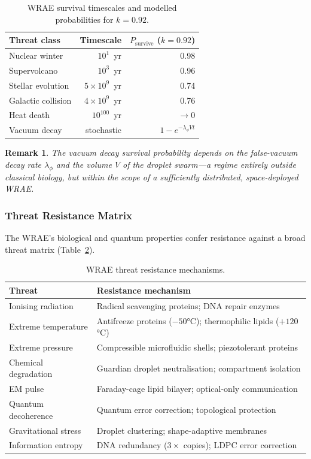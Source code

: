 \documentclass[12pt,a4paper]{article}
\newtheorem{remark}[theorem]{Remark}
\begin{document}
\begin{table}[ht]
\centering
\caption{WRAE survival timescales and modelled probabilities for $k = 0.92$.}
\label{tab:survival}
\begin{tabular}{lrr}
\toprule
\textbf{Threat class} & \textbf{Timescale} & \textbf{$P_\mathrm{survive}$ ($k=0.92$)} \\
\midrule
Nuclear winter          & $10^1$~yr    & 0.98 \\
Supervolcano            & $10^3$~yr    & 0.96 \\
Stellar evolution       & $5\times10^9$~yr  & 0.74 \\
Galactic collision      & $4\times10^9$~yr  & 0.76 \\
Heat death              & $10^{100}$~yr     & $\to 0$ \\
Vacuum decay            & stochastic        & $1-e^{-\lambda_\phi V t}$ \\
\bottomrule
\end{tabular}
\end{table}

\begin{remark}
The vacuum decay survival probability depends on the false-vacuum decay rate
$\lambda_\phi$ and the volume $V$ of the droplet swarm—a regime entirely
outside classical biology, but within the scope of a sufficiently
distributed, space-deployed WRAE.
\end{remark}

\subsubsection{Threat Resistance Matrix}

The WRAE's biological and quantum properties confer resistance against
a broad threat matrix (Table~\ref{tab:threats}).

\begin{table}[ht]
\centering
\caption{WRAE threat resistance mechanisms.}
\label{tab:threats}
\begin{tabular}{lp{6.5cm}}
\toprule
\textbf{Threat} & \textbf{Resistance mechanism} \\
\midrule
Ionising radiation    & Radical scavenging proteins; DNA repair enzymes \\
Extreme temperature   & Antifreeze proteins ($-50$°C); thermophilic lipids ($+120$°C) \\
Extreme pressure      & Compressible microfluidic shells; piezotolerant proteins \\
Chemical degradation  & Guardian droplet neutralisation; compartment isolation \\
EM pulse              & Faraday-cage lipid bilayer; optical-only communication \\
Quantum decoherence   & Quantum error correction; topological protection \\
Gravitational stress  & Droplet clustering; shape-adaptive membranes \\
Information entropy   & DNA redundancy ($3\times$ copies); LDPC error correction \\
\bottomrule
\end{tabular}
\end{table}
\end{document}
